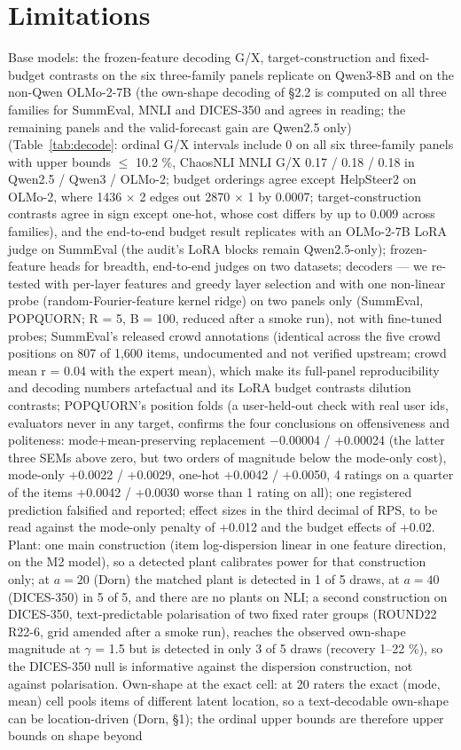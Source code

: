\documentclass[10pt]{article}
\begin{document}
\section{Limitations}

Base models: the frozen-feature decoding G/X, target-construction and fixed-budget contrasts on the six three-family panels replicate on Qwen3-8B and on the non-Qwen OLMo-2-7B (the own-shape decoding of \S{}2.2 is computed on all three families for SummEval, MNLI and DICES-350 and agrees in reading; the remaining panels and the valid-forecast gain are Qwen2.5 only) (Table~\ref{tab:decode}: ordinal G/X intervals include 0 on all six three-family panels with upper bounds $\leq$ 10.2 \%, ChaosNLI MNLI G/X 0.17 / 0.18 / 0.18 in Qwen2.5 / Qwen3 / OLMo-2; budget orderings agree except HelpSteer2 on OLMo-2, where 1436 $\times$ 2 edges out 2870 $\times$ 1 by 0.0007; target-construction contrasts agree in sign except one-hot, whose cost differs by up to 0.009 across families), and the end-to-end budget result replicates with an OLMo-2-7B LoRA judge on SummEval (the audit's LoRA blocks remain Qwen2.5-only); frozen-feature heads for breadth, end-to-end judges on two datasets; decoders --- we re-tested with per-layer features and greedy layer selection and with one non-linear probe (random-Fourier-feature kernel ridge) on two panels only (SummEval, POPQUORN; R = 5, B = 100, reduced after a smoke run), not with fine-tuned probes; SummEval's released crowd annotations (identical across the five crowd positions on 807 of 1,600 items, undocumented and not verified upstream; crowd mean r = 0.04 with the expert mean), which make its full-panel reproducibility and decoding numbers artefactual and its LoRA budget contrasts dilution contrasts; POPQUORN's position folds (a user-held-out check with real user ids, evaluators never in any target, confirms the four conclusions on offensiveness and politeness: mode+mean-preserving replacement $-$0.00004 / +0.00024 (the latter three SEMs above zero, but two orders of magnitude below the mode-only cost), mode-only +0.0022 / +0.0029, one-hot +0.0042 / +0.0050, 4 ratings on a quarter of the items +0.0042 / +0.0030 worse than 1 rating on all); one registered prediction falsified and reported; effect sizes in the third decimal of RPS, to be read against the mode-only penalty of +0.012 and the budget effects of +0.02. Plant: one main construction (item log-dispersion linear in one feature direction, on the M2 model), so a detected plant calibrates power for that construction only; at \(a=20\) (Dorn) the matched plant is detected in 1 of 5 draws, at \(a=40\) (DICES-350) in 5 of 5, and there are no plants on NLI; a second construction on DICES-350, text-predictable polarisation of two fixed rater groups (ROUND22 R22-6, grid amended after a smoke run), reaches the observed own-shape magnitude at $\gamma$ = 1.5 but is detected in only 3 of 5 draws (recovery 1--22 \%), so the DICES-350 null is informative against the dispersion construction, not against polarisation. Own-shape at the exact cell: at 20 raters the exact (mode, mean) cell pools items of different latent location, so a text-decodable own-shape can be location-driven (Dorn, \S{}1); the ordinal upper bounds are therefore upper bounds on shape beyond 
\end{document}
